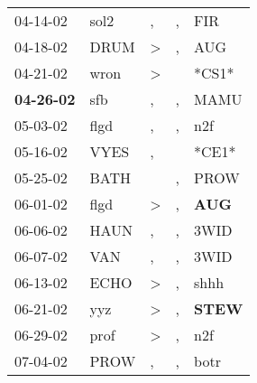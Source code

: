 \begin{supertabular}{p{0.07\textwidth}p{0.06\textwidth}p{0.02\textwidth}p{0.02\textwidth}p{0.06\textwidth}}
          04-14-02\textsuperscript{} &           sol2\textsuperscript{} &                , &                , &            FIR\textsuperscript{} \\
          04-18-02\textsuperscript{} &           DRUM\textsuperscript{} &     \textgreater &                , &            AUG\textsuperscript{} \\
          04-21-02\textsuperscript{} &           wron\textsuperscript{} &     \textgreater &                  &                            *CS1* \\
 \textbf{04-26-02\textsuperscript{}} &            sfb\textsuperscript{} &                , &                , &           MAMU\textsuperscript{} \\
          05-03-02\textsuperscript{} &           flgd\textsuperscript{} &                , &                , &            n2f\textsuperscript{} \\
          05-16-02\textsuperscript{} &           VYES\textsuperscript{} &                , &                  &                            *CE1* \\
          05-25-02\textsuperscript{} &           BATH\textsuperscript{} &                  &                , &           PROW\textsuperscript{} \\
          06-01-02\textsuperscript{} &           flgd\textsuperscript{} &     \textgreater &                , &   \textbf{AUG\textsuperscript{}} \\
          06-06-02\textsuperscript{} &           HAUN\textsuperscript{} &                , &                , &           3WID\textsuperscript{} \\
          06-07-02\textsuperscript{} &            VAN\textsuperscript{} &                , &                , &           3WID\textsuperscript{} \\
          06-13-02\textsuperscript{} &           ECHO\textsuperscript{} &     \textgreater &                , &           shhh\textsuperscript{} \\
          06-21-02\textsuperscript{} &            yyz\textsuperscript{} &     \textgreater &                , &  \textbf{STEW\textsuperscript{}} \\
          06-29-02\textsuperscript{} &           prof\textsuperscript{} &     \textgreater &                , &            n2f\textsuperscript{} \\
          07-04-02\textsuperscript{} &           PROW\textsuperscript{} &                , &                , &           botr\textsuperscript{} \\

\end{supertabular}
